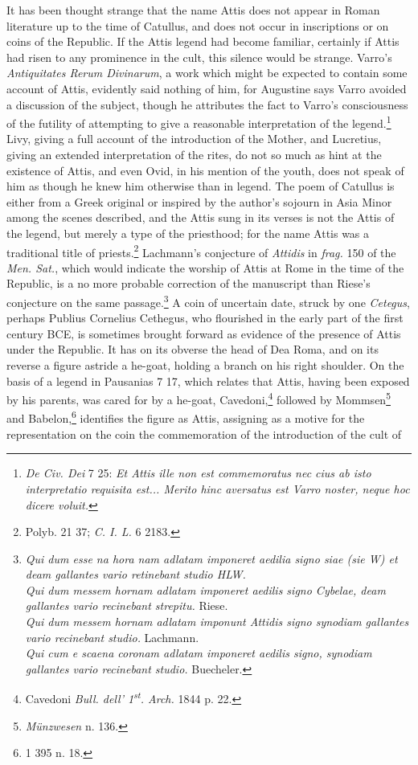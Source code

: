 \documentclass[a4paper, 11pt, oneside, polutonikogreek, english]{article}
\begin{document}
It has been thought strange that the name Attis does not appear in Roman literature up to the time of Catullus, and does not occur in inscriptions or on coins of the Republic. If the Attis legend had become familiar, certainly if Attis had risen to any prominence in the cult, this silence would be strange. Varro's \emph{Antiquitates Rerum Divinarum}, a work which might be expected to contain some account of Attis, evidently said nothing of him, for Augustine says Varro avoided a discussion of the subject, though he attributes the fact to Varro's consciousness of the futility of attempting to give a reasonable interpretation of the legend.\footnote{\emph{De Civ. Dei} 7 25: \emph{Et Attis ille non est commemoratus nec cius ab isto interpretatio requisita est... Merito hinc aversatus est Varro noster, neque hoc dicere voluit.}} Livy, giving a full account of the introduction of the Mother, and Lucretius, giving an extended interpretation of the rites, do not so much as hint at the existence of Attis, and even Ovid, in his mention of the youth, does not speak of him as though he knew him otherwise than in legend. The poem of Catullus is either from a Greek original or inspired by the author's sojourn in Asia Minor among the scenes described, and the Attis sung in its verses is not the Attis of the legend, but merely a type of the priesthood; for the name Attis was a traditional title of priests.\footnote{Polyb. 21 37; \emph{C. I. L.} 6 2183.} Lachmann's conjecture of \emph{Attidis} in \emph{frag.} 150 of the \emph{Men. Sat.}, which would indicate the worship of Attis at Rome in the time of the Republic, is a no more probable correction of the manuscript than Riese's conjecture on the same passage.\footnote{\emph{Qui dum esse na hora nam adlatam imponeret aedilia signo siae (sie W) et deam gallantes vario retinebant studio HLW.}\\\hspace*{10mm}\emph{Qui dum messem hornam adlatam imponeret aedilis signo Cybelae, deam gallantes vario recinebant strepitu.} Riese.\\\hspace*{10mm}\emph{Qui dum messem hornam adlatam imponunt Attidis signo synodiam gallantes vario recinebant studio.} Lachmann.\\\hspace*{10mm}\emph{Qui cum e scaena coronam adlatam imponeret aedilis signo, synodiam gallantes vario recinebant studio.} Buecheler.} A coin of uncertain date, struck by one \emph{Cetegus}, perhaps Publius Cornelius Cethegus, who flourished in the early part of the first century \textsc{BCE}, is sometimes brought forward as evidence of the presence of Attis under the Republic. It has on its obverse the head of Dea Roma, and on its reverse a figure astride a he-goat, holding a branch on his right shoulder. On the basis of a legend in Pausanias 7 17, which relates that Attis, having been exposed by his parents, was cared for by a he-goat, Cavedoni,\footnote{Cavedoni \emph{Bull. dell' 1\textsuperscript{st}. Arch.} 1844 p. 22.} followed by Mommsen\footnote{\emph{Münzwesen} n. 136.} and Babelon,\footnote{1 395 n. 18.} identifies the figure as Attis, assigning as a motive for the representation on the coin the commemoration of the introduction of the cult of 
\end{document}
